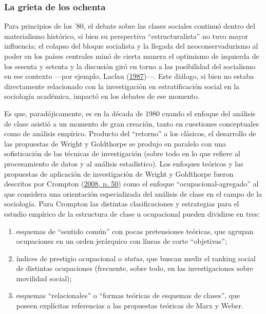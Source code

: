 \documentclass[
]{article}
\providecommand{\tightlist}{%
  \setlength{\itemsep}{0pt}\setlength{\parskip}{0pt}}
\begin{document}
\hypertarget{la-grieta-de-los-ochenta}{%
\subsubsection{La grieta de los ochenta}\label{la-grieta-de-los-ochenta}}

Para principios de los '80, el debate sobre las clases sociales continuó dentro del materialismo histórico, si bien su perspectiva ``estructuralista'' no tuvo mayor influencia; el colapso del bloque socialista y la llegada del neoconservadurismo al poder en los países centrales minó de cierta manera el optimismo de izquierda de los sesenta y setenta y la discusión giró en torno a las posibilidad del socialismo en ese contexto ---por ejemplo, Laclau (\protect\hyperlink{ref-Laclau1987}{1987})---. Este diálogo, si bien no estaba directamente relacionado con la investigación en estratificación social en la sociología académica, impactó en los debates de ese momento.

Es que, paradójicamente, es en la década de 1980 cuando el enfoque del análisis de clase asistió a un momento de gran creación, tanto en cuestiones conceptuales como de análisis empírico. Producto del ``retorno'' a los clásicos, el desarrollo de las propuestas de Wright y Goldthorpe se produjo en paralelo con una sofisticación de las técnicas de investigación (sobre todo en lo que refiere al procesamiento de datos y al análisis estadístico). Los enfoques teóricos y las propuestas de aplicación de investigación de Wright y Goldthorpe fueron descritos por Crompton (\protect\hyperlink{ref-Crompton2008}{2008, p. 50}) como el enfoque ``ocupacional-agregado'' al que considera una orientación especializada del análisis de clase en el campo de la sociología. Para Crompton las distintas clasificaciones y estrategias para el estudio empírico de la estructura de clase u ocupacional pueden dividirse en tres:

\begin{enumerate}
\def\labelenumi{\roman{enumi}.}
\tightlist
\item
  esquemas de ``sentido común'' con pocas pretensiones teóricas, que agrupan ocupaciones en un orden jerárquico con líneas de corte ``objetivas'';
\item
  índices de prestigio ocupacional o \emph{status}, que buscan medir el ranking social de distintas ocupaciones (frecuente, sobre todo, en las investigaciones sobre movilidad social);
\item
  esquemas ``relacionales'' o ``formas teóricas de esquemas de clases'', que poseen explícitas referencias a las propuestas teóricas de Marx y Weber.
\end{enumerate}
\end{document}
